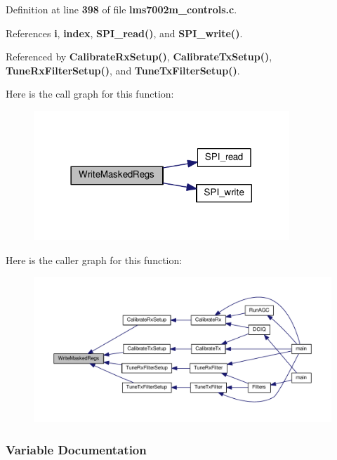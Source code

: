 Definition at line {\bf 398} of file {\bf lms7002m\+\_\+controls.\+c}.



References {\bf i}, {\bf index}, {\bf S\+P\+I\+\_\+read()}, and {\bf S\+P\+I\+\_\+write()}.



Referenced by {\bf Calibrate\+Rx\+Setup()}, {\bf Calibrate\+Tx\+Setup()}, {\bf Tune\+Rx\+Filter\+Setup()}, and {\bf Tune\+Tx\+Filter\+Setup()}.



Here is the call graph for this function\+:
\nopagebreak
\begin{figure}[H]
\begin{center}
\leavevmode
\includegraphics[width=273pt]{d7/db8/lms7002m__controls_8c_a6da6f3d264a9c184fe58dc2945efda1f_cgraph}
\end{center}
\end{figure}




Here is the caller graph for this function\+:
\nopagebreak
\begin{figure}[H]
\begin{center}
\leavevmode
\includegraphics[width=350pt]{d7/db8/lms7002m__controls_8c_a6da6f3d264a9c184fe58dc2945efda1f_icgraph}
\end{center}
\end{figure}




\subsubsection{Variable Documentation}
